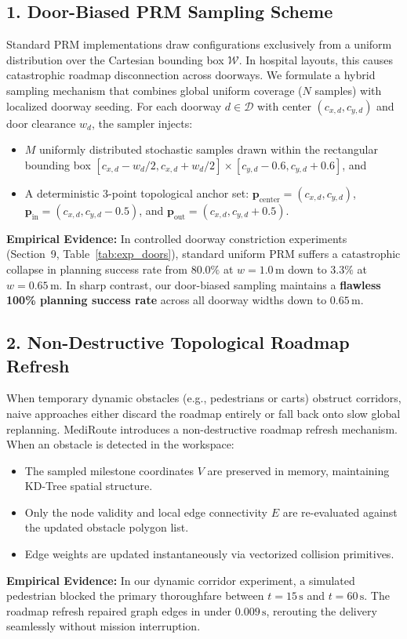 \documentclass[12pt,a4paper]{article}
\begin{document}
\subsection{1. Door-Biased PRM Sampling Scheme}
Standard PRM implementations draw configurations exclusively from a uniform distribution over the Cartesian bounding box $\mathcal{W}$. In hospital layouts, this causes catastrophic roadmap disconnection across doorways. We formulate a hybrid sampling mechanism that combines global uniform coverage ($N$ samples) with localized doorway seeding. For each doorway $d \in \mathcal{D}$ with center $(c_{x,d}, c_{y,d})$ and door clearance $w_d$, the sampler injects:
\begin{itemize}[itemsep=1pt,topsep=1pt]
\item $M$ uniformly distributed stochastic samples drawn within the rectangular bounding box $[c_{x,d} - w_d/2, c_{x,d} + w_d/2] \times [c_{y,d} - 0.6, c_{y,d} + 0.6]$, and
\item A deterministic 3-point topological anchor set: $\mathbf{p}_{\text{center}} = (c_{x,d}, c_{y,d})$, $\mathbf{p}_{\text{in}} = (c_{x,d}, c_{y,d} - 0.5)$, and $\mathbf{p}_{\text{out}} = (c_{x,d}, c_{y,d} + 0.5)$.
\end{itemize}
\textbf{Empirical Evidence:} In controlled doorway constriction experiments (Section~9, Table~\ref{tab:exp_doors}), standard uniform PRM suffers a catastrophic collapse in planning success rate from $80.0\%$ at $w = 1.0\,\text{m}$ down to $3.3\%$ at $w = 0.65\,\text{m}$. In sharp contrast, our door-biased sampling maintains a \textbf{flawless 100\% planning success rate} across all doorway widths down to $0.65\,\text{m}$.

\subsection{2. Non-Destructive Topological Roadmap Refresh}
When temporary dynamic obstacles (e.g., pedestrians or carts) obstruct corridors, naive approaches either discard the roadmap entirely or fall back onto slow global replanning. MediRoute introduces a non-destructive roadmap refresh mechanism. When an obstacle is detected in the workspace:
\begin{itemize}[itemsep=1pt,topsep=1pt]
\item The sampled milestone coordinates $V$ are preserved in memory, maintaining KD-Tree spatial structure.
\item Only the node validity and local edge connectivity $E$ are re-evaluated against the updated obstacle polygon list.
\item Edge weights are updated instantaneously via vectorized collision primitives.
\end{itemize}
\textbf{Empirical Evidence:} In our dynamic corridor experiment, a simulated pedestrian blocked the primary thoroughfare between $t = 15\,\text{s}$ and $t = 60\,\text{s}$. The roadmap refresh repaired graph edges in under $0.009\,\text{s}$, rerouting the delivery seamlessly without mission interruption.
\end{document}
